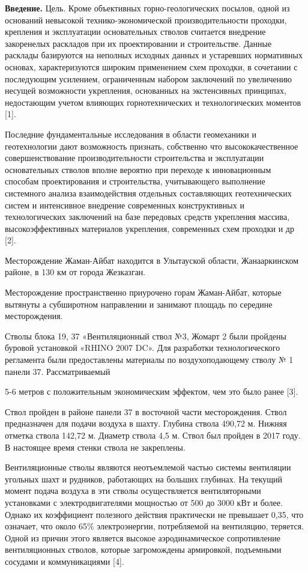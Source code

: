 \begin{multicols}{2}
{\bfseries Введение.} Цель. Кроме объективных горно-геологических посылов,
одной из оснований невысокой технико-экономической производительности
проходки, крепления и эксплуатации основательных стволов считается
внедрение закоренелых раскладов при их проектировании и строительстве.
Данные расклады базируются на неполных исходных данных и устаревших
нормативных основах, характеризуются широким применением схем проходки,
в сочетании с последующим усилением, ограниченным набором заключений по
увеличению несущей возможности укрепления, основанных на экстенсивных
принципах, недостающим учетом влияющих горнотехнических и
технологических моментов {[}1{]}.

Последние фундаментальные исследования в области геомеханики и
геотехнологии дают возможность признать, собственно что
высококачественное совершенствование производительности строительства и
эксплуатации основательных стволов вполне вероятно при переходе к
инновационным способам проектирования и строительства, учитывающего
выполнение системного анализа взаимодействия отдельных составляющих
геотехнических систем и интенсивное внедрение современных конструктивных
и технологических заключений на базе передовых средств укрепления
массива, высокоэффективных материалов укрепления, современных схем
проходки и др {[}2{]}.

Месторождение Жаман-Айбат находится в Улытауской области, Жанааркинском
районе, в 130 км от города Жезказган.

Месторождение пространственно приурочено горам Жаман-Айбат, которые
вытянуты а субширотном направлении и занимают площадь по середине
месторождения.

Стволы блока 19, 37 «Вентиляционный ствол №3, Жомарт 2 были пройдены
буровой установкой «RHINO 2007 DC». Для разработки технологического
регламента были предоставлены материалы по воздухоподающему стволу № 1
панели 37. Рассматриваемый

5-6 метров с положительным экономическим эффектом, чем это было ранее
{[}3{]}.

Ствол пройден в районе панели 37 в восточной части месторождения. Ствол
предназначен для подачи воздуха в шахту. Глубина ствола 490,72 м. Нижняя
отметка ствола 142,72 м. Диаметр ствола 4,5 м. Ствол был пройден в 2017
году. В настоящее время стенки ствола не закреплены.

Вентиляционные стволы являются неотъемлемой частью системы вентиляции
угольных шахт и рудников, работающих на больших глубинах. На текущий
момент подача воздуха в эти стволы осуществляется вентиляторными
установками с электродвигателями мощностью от 500 до 3000 кВт и более.
Однако их коэффициент полезного действия практически не превышает 0,35,
что означает, что около 65\% электроэнергии, потребляемой на вентиляцию,
теряется. Одной из причин этого является высокое аэродинамическое
сопротивление вентиляционных стволов, которые загромождены армировкой,
подъемными сосудами и коммуникациями {[}4{]}.


\end{multicols}
